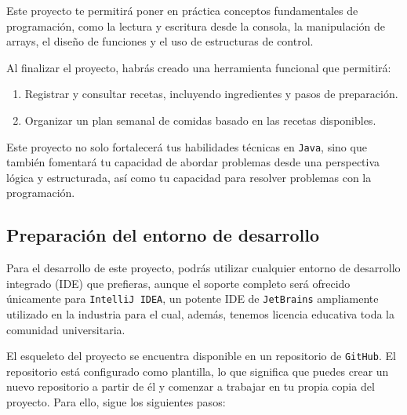 \documentclass[
    a4paper, %
    12pt, %
]{CSSullivanBusinessReport}
\begin{document}
Este proyecto te permitirá poner en práctica conceptos fundamentales de programación, como la lectura y escritura desde la consola, la manipulación de arrays, el diseño de funciones y el uso de estructuras de control.

Al finalizar el proyecto, habrás creado una herramienta funcional que permitirá:
\begin{enumerate}
    \item Registrar y consultar recetas, incluyendo ingredientes y pasos de preparación.
    \item Organizar un plan semanal de comidas basado en las recetas disponibles.
\end{enumerate}

Este proyecto no solo fortalecerá tus habilidades técnicas en \texttt{Java}, sino que también fomentará tu capacidad de abordar problemas desde una perspectiva lógica y estructurada, así como tu capacidad para resolver problemas con la programación.

\subsection{Preparación del entorno de desarrollo} %

Para el desarrollo de este proyecto, podrás utilizar cualquier entorno de desarrollo integrado (IDE) que prefieras, aunque el soporte completo será ofrecido únicamente para \texttt{IntelliJ IDEA}, un potente IDE de \texttt{JetBrains} ampliamente utilizado en la industria para el cual, además, tenemos licencia educativa toda la comunidad universitaria.

El esqueleto del proyecto se encuentra disponible en un repositorio de \texttt{GitHub}. El repositorio está configurado como plantilla, lo que significa que puedes crear un nuevo repositorio a partir de él y comenzar a trabajar en tu propia copia del proyecto. Para ello, sigue los siguientes pasos:
\end{document}
